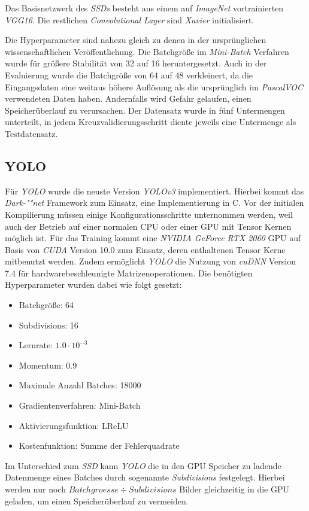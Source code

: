 Das Basisnetzwerk des \textit{SSDs} besteht aus einem auf \textit{ImageNet} vortrainierten \textit{VGG16}. Die restlichen \textit{Convolutional Layer} sind \textit{Xavier} initialisiert. 

Die Hyperparameter sind nahezu gleich zu denen in der ursprünglichen wissenschaftlichen Veröffentlichung. Die Batchgröße im \textit{Mini-Batch} Verfahren wurde für größere Stabilität von 32 auf 16 heruntergesetzt. Auch in der Evaluierung wurde die Batchgröße von 64 auf 48 verkleinert, da die Eingangsdaten eine weitaus höhere Auflösung als die ursprünglich im \textit{PascalVOC} verwendeten Daten haben. Andernfalls wird Gefahr gelaufen, einen Speicherüberlauf zu verursachen. Der Datensatz wurde in fünf Untermengen unterteilt, in jedem Kreuzvalidierungsschritt diente jeweils eine Untermenge als Testdatensatz.

\subsection*{YOLO}

Für \textit{YOLO} wurde die neuste Version \textit{YOLOv3} implementiert. Hierbei kommt das \textit{Dark-""net} Framework zum Einsatz, eine Implementierung in C. Vor der initialen Kompilierung müssen einige Konfigurationsschritte unternommen werden, weil auch der Betrieb auf einer normalen CPU oder einer GPU mit Tensor Kernen möglich ist. Für das Training kommt eine \textit{NVIDIA GeForce RTX 2060} GPU auf Basis von \textit{CUDA} Version 10.0 zum Einsatz, deren enthaltenen Tensor Kerne mitbenutzt werden. Zudem ermöglicht \textit{YOLO} die Nutzung von \textit{cuDNN} Version 7.4 für hardwarebeschleunigte Matrizenoperationen. Die benötigten Hyperparameter wurden dabei wie folgt gesetzt:

\begin{itemize}
	\item Batchgröße: 64
	\item Subdivisions: 16
	\item Lernrate: $1.0\cdot 10^{-3}$
	\item Momentum: 0.9
	\item Maximale Anzahl Batches: 18000
	\item Gradientenverfahren: Mini-Batch
	\item Aktivierungsfunktion: LReLU
	\item Kostenfunktion: Summe der Fehlerquadrate
\end{itemize}

Im Unterschied zum \textit{SSD} kann \textit{YOLO} die in den GPU Speicher zu ladende Datenmenge eines Batches durch sogenannte \textit{Subdivisions} festgelegt. Hierbei werden nur noch $Batchgroesse \div Subdivisions$ Bilder gleichzeitig in die GPU geladen, um einen Speicherüberlauf zu vermeiden.

